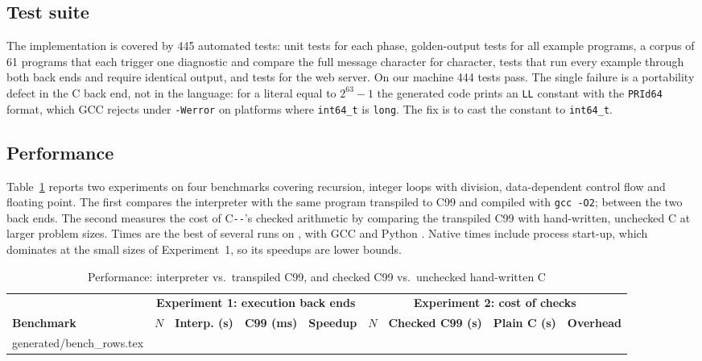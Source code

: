 \documentclass[conference]{IEEEtran}
\makeatletter
\newcommand{\inputrows}[1]{\@@input #1 }
\newcommand{\cmm}{C\texttt{-{}-}}
\makeatother
\begin{document}
\subsection{Test suite}
The implementation is covered by 445 automated tests: unit tests for each phase, golden-output tests for all
example programs, a corpus of 61 programs that each trigger one diagnostic and compare the full message
character for character, tests that run every example through both back ends and require identical output,
and tests for the web server. On our machine 444 tests pass. The single failure is a portability defect in
the C back end, not in the language: for a literal equal to $2^{63}-1$ the generated code prints an
\texttt{LL} constant with the \texttt{PRId64} format, which GCC rejects under \texttt{-Werror} on platforms
where \texttt{int64\_t} is \texttt{long}. The fix is to cast the constant to \texttt{int64\_t}.

\subsection{Performance}
Table~\ref{tab:perf} reports two experiments on four benchmarks covering recursion, integer loops with
division, data-dependent control flow and floating point. The first compares the interpreter with the same
program transpiled to C99 and compiled with \texttt{gcc -O2}; \benchAllMatch{} between the two back ends.
The second measures the cost of \cmm{}'s checked arithmetic by comparing the transpiled C99 with hand-written,
unchecked C at larger problem sizes. Times are the best of several runs on \benchCPU{}, with GCC \benchCC{}
and Python \benchPython{}. Native times include process start-up, which dominates at the small sizes of
Experiment~1, so its speedups are lower bounds.

\begin{table}[t]
\caption{Performance: interpreter vs.\ transpiled C99, and checked C99 vs.\ unchecked hand-written C}
\label{tab:perf}
\centering
\footnotesize
\begin{tabular}{@{}l r r r r r r r r@{}}
\toprule
 & \multicolumn{4}{c}{\textbf{Experiment 1: execution back ends}} & \multicolumn{4}{c}{\textbf{Experiment 2: cost of checks}} \\
\cmidrule(lr){2-5}\cmidrule(l){6-9}
\textbf{Benchmark} & $N$ & \textbf{Interp. (s)} & \textbf{C99 (ms)} & \textbf{Speedup} & $N$ & \textbf{Checked C99 (s)} & \textbf{Plain C (s)} & \textbf{Overhead} \\
\midrule
\inputrows{generated/bench_rows.tex}
\bottomrule
\end{tabular}
\end{table}
\end{document}
